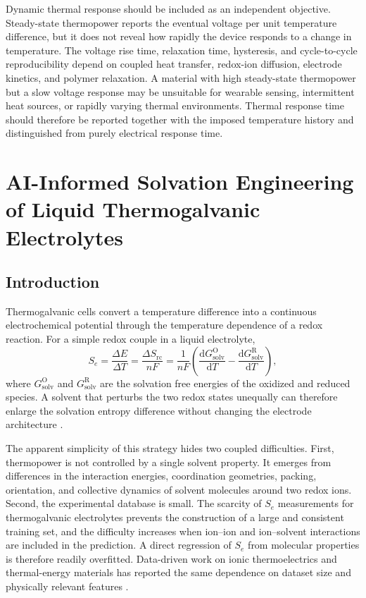 \documentclass[a4paper,12pt]{report}
\begin{document}
Dynamic thermal response should be included as an independent objective.
Steady-state thermopower reports the eventual voltage per unit temperature
difference, but it does not reveal how rapidly the device responds to a change
in temperature. The voltage rise time, relaxation time, hysteresis, and
cycle-to-cycle reproducibility depend on coupled heat transfer, redox-ion
diffusion, electrode kinetics, and polymer relaxation. A material with high
steady-state thermopower but a slow voltage response may be unsuitable for
wearable sensing, intermittent heat sources, or rapidly varying thermal
environments. Thermal response time should therefore be reported together with
the imposed temperature history and distinguished from purely electrical
response time.

\chapter{AI-Informed Solvation Engineering of Liquid Thermogalvanic
Electrolytes}

\section{Introduction}

Thermogalvanic cells convert a temperature difference into a continuous
electrochemical potential through the temperature dependence of a redox
reaction. For a simple redox couple in a liquid electrolyte,
\begin{equation}
S_e=\frac{\Delta E}{\Delta T}
=\frac{\Delta S_{\mathrm{rc}}}{nF}
=\frac{1}{nF}
\left(
\frac{\mathrm{d}G_{\mathrm{solv}}^{\mathrm{O}}}{\mathrm{d}T}
-
\frac{\mathrm{d}G_{\mathrm{solv}}^{\mathrm{R}}}{\mathrm{d}T}
\right),
\end{equation}
where $G_{\mathrm{solv}}^{\mathrm{O}}$ and
$G_{\mathrm{solv}}^{\mathrm{R}}$ are the solvation free energies of the
oxidized and reduced species. A solvent that perturbs the two redox states
unequally can therefore enlarge the solvation entropy difference without
changing the electrode architecture \citep{chen2023solvation}.

The apparent simplicity of this strategy hides two coupled difficulties.
First, thermopower is not controlled by a single solvent property. It emerges
from differences in the interaction energies, coordination geometries, packing,
orientation, and collective dynamics of solvent molecules around two redox
ions. Second, the experimental database is small. The scarcity of $S_e$
measurements for thermogalvanic electrolytes prevents the construction of a
large and consistent training set, and the difficulty increases when
ion--ion and ion--solvent interactions are included in the prediction. A
direct regression of $S_e$ from molecular properties is therefore readily
overfitted. Data-driven work on ionic thermoelectrics and thermal-energy
materials has reported the same dependence on dataset size and physically
relevant features \citep{wu2024unlocking,li2022mlthermal}.
\end{document}
